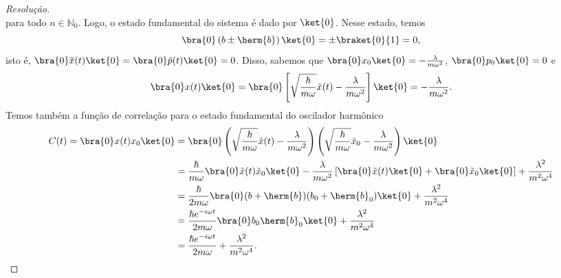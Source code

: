 \begin{proof}[Resolução]
\begin{equation*}
    \end{equation*}
    para todo \(n \in \mathbb{N}_0\). Logo, o estado fundamental do sistema é dado por \(\ket{0}\). Nesse estado, temos
    \begin{equation*}
        \bra{0} \left(b \pm  \herm{b}\right) \ket{0} = \pm \braket{0}{1} = 0,
    \end{equation*}
    isto é, \(\bra{0}\tilde{x}(t)\ket{0} = \bra{0}\tilde{p}(t)\ket{0} = 0\). Disso, sabemos que \(\bra{0}x_0\ket{0} = - \frac{\lambda}{m \omega^2}\), \(\bra{0} p_0\ket{0} = 0\) e
    \begin{equation*}
        \bra{0}x(t)\ket{0} = \bra{0}\left[\sqrt{\frac\hbar{m \omega}} \tilde{x}(t) - \frac{\lambda}{m \omega^2}\right]\ket{0} = - \frac{\lambda}{m \omega^2}.
    \end{equation*}
    Temos também a função de correlação para o estado fundamental do oscilador harmônico
    \begin{align*}
        C(t) = \bra{0}x(t)x_0\ket{0} &= \bra{0}\left(\sqrt{\frac{\hbar}{m \omega}} \tilde{x}(t) - \frac{\lambda}{m \omega^2}\right)\left(\sqrt{\frac{\hbar}{m \omega}} \tilde{x}_0 - \frac{\lambda}{m \omega^2}\right)\ket{0}\\
                              &= \frac{\hbar}{m \omega} \bra{0} \tilde{x}(t) \tilde{x}_0 \ket{0} -\frac{\lambda}{m\omega^2} \left[\bra{0}\tilde{x}(t)\ket{0}+ \bra{0}\tilde{x}_0\ket{0}\right] + \frac{\lambda^2}{m^2 \omega^4}\\
                              &= \frac{\hbar}{2m \omega} \bra{0}(b + \herm{b})(b_0 + \herm{b}_0)\ket{0} + \frac{\lambda^2}{m^2 \omega^4}\\
                              &= \frac{\hbar e^{-i \omega t}}{2m \omega} \bra{0} b_0 \herm{b}_0 \ket{0} + \frac{\lambda^2}{m^2 \omega^4}\\
                              &= \frac{\hbar e^{-i \omega t}}{2 m \omega} + \frac{\lambda^2}{m^2 \omega^4}.
    \end{align*}


\end{proof}

